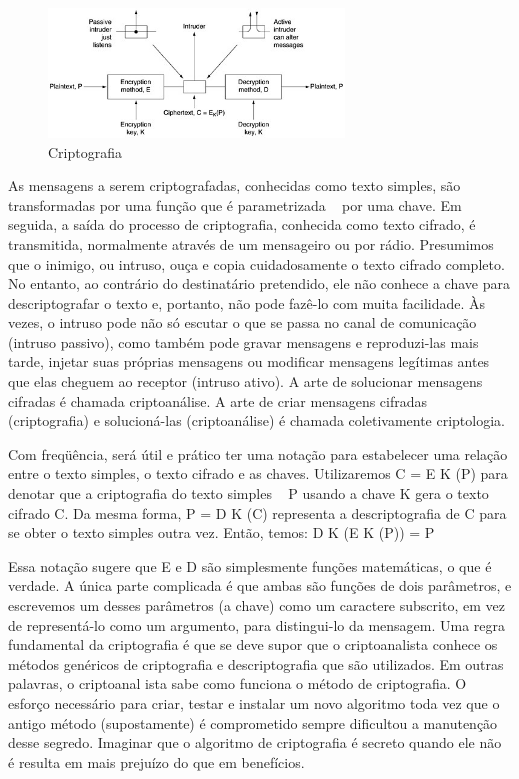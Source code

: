 \begin{figure}
\begin{center}
	\includegraphics[width=0.7\textwidth]{criptografia1}
\end{center}
\caption{Criptografia~\cite{tanenbaum}}
\label{fig: criptografia}
\end{figure}


As mensagens a serem criptografadas, conhecidas como texto simples, são transformadas por uma 
função que é parametrizada ~\cite{tanenbaum} por uma chave. Em seguida, a saída do processo de criptografia, conhecida como texto cifrado, é transmitida, normalmente através de um mensageiro ou por rádio. Presumimos que o inimigo, ou intruso, ouça e copia cuidadosamente o texto cifrado completo. No entanto, ao contrário do destinatário pretendido, ele não conhece a chave para descriptografar o texto e, portanto, não pode fazê-lo com muita facilidade. Às vezes, o intruso pode  não só escutar o que se passa no canal de comunicação (intruso passivo), como também pode  gravar mensagens e reproduzi-las mais tarde, injetar suas próprias mensagens ou modificar mensagens legítimas antes que elas cheguem ao receptor (intruso ativo). A arte de solucionar mensagens cifradas é chamada criptoanálise. A arte de criar mensagens cifradas (criptografia) e solucioná-las (criptoanálise) é chamada coletivamente criptologia. 

Com freqüência, será útil e prático ter uma notação para estabelecer uma relação entre o texto 
simples, o texto cifrado e as chaves. Utilizaremos C = E K (P) para denotar que a criptografia do texto simples ~\cite{tanenbaum} P usando a chave K gera o texto cifrado C. Da mesma forma, P = D K (C) representa a descriptografia de C para se obter o texto simples outra vez. Então, temos: 
D K (E K (P)) = P 

Essa notação sugere que E e D são simplesmente funções matemáticas, o que é verdade. A única 
parte complicada é que ambas são funções de dois parâmetros, e escrevemos um desses 
parâmetros (a chave) como um caractere subscrito, em vez de representá-lo como um argumento, 
para distingui-lo da mensagem. 
Uma regra fundamental da criptografia é que se deve supor que o criptoanalista conhece os 
métodos genéricos de criptografia e descriptografia que são utilizados. Em outras palavras, o 
criptoanal ista sabe como funciona o método de criptografia. O esforço necessário para criar, testar e instalar um novo algoritmo toda vez que o antigo método (supostamente) é comprometido sempre dificultou a manutenção desse segredo. 
Imaginar que o algoritmo de criptografia é secreto quando ele não é resulta em mais prejuízo do que em benefícios.


